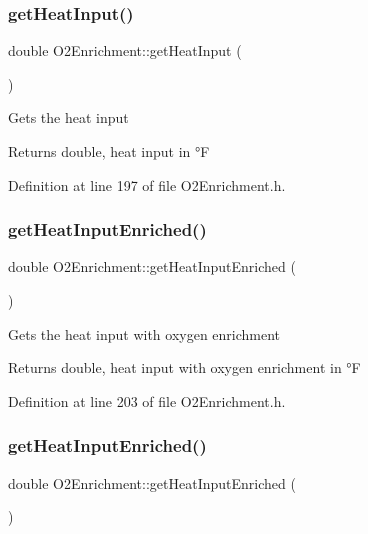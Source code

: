 \subsubsection{\texorpdfstring{get\+Heat\+Input()}{getHeatInput()}\hspace{0.1cm}{\footnotesize\ttfamily [3/3]}}
{\footnotesize\ttfamily double O2\+Enrichment\+::get\+Heat\+Input (\begin{DoxyParamCaption}{ }\end{DoxyParamCaption})\hspace{0.3cm}{\ttfamily [inline]}}

Gets the heat input \begin{DoxyReturn}{Returns}
double, heat input in °F 
\end{DoxyReturn}


Definition at line 197 of file O2\+Enrichment.\+h.

\mbox{\label{class_o2_enrichment_ac1d74fe5a8791b9a8bc596bcb19b8b1e}} 
\subsubsection{\texorpdfstring{get\+Heat\+Input\+Enriched()}{getHeatInputEnriched()}\hspace{0.1cm}{\footnotesize\ttfamily [1/3]}}
{\footnotesize\ttfamily double O2\+Enrichment\+::get\+Heat\+Input\+Enriched (\begin{DoxyParamCaption}{ }\end{DoxyParamCaption})\hspace{0.3cm}{\ttfamily [inline]}}

Gets the heat input with oxygen enrichment \begin{DoxyReturn}{Returns}
double, heat input with oxygen enrichment in °F 
\end{DoxyReturn}


Definition at line 203 of file O2\+Enrichment.\+h.

\mbox{\label{class_o2_enrichment_ac1d74fe5a8791b9a8bc596bcb19b8b1e}} 
\subsubsection{\texorpdfstring{get\+Heat\+Input\+Enriched()}{getHeatInputEnriched()}\hspace{0.1cm}{\footnotesize\ttfamily [2/3]}}
{\footnotesize\ttfamily double O2\+Enrichment\+::get\+Heat\+Input\+Enriched (\begin{DoxyParamCaption}{ }\end{DoxyParamCaption})\hspace{0.3cm}{\ttfamily [inline]}}

